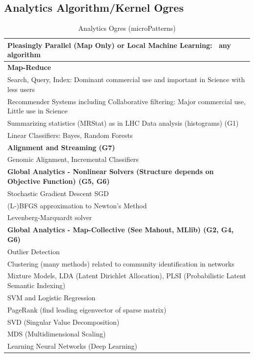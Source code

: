 \documentclass{acm_proc_article-sp}
\begin{document}
\subsection{Analytics Algorithm/Kernel Ogres}
\begin{table}
\centering
\caption{Analytics Ogres (microPatterns)}
\label{Table9}
\begin{tabular}{|p{12cm}|} \hline

\textbf{Pleasingly Parallel (Map Only) or Local Machine Learning: ~any algorithm} \\ \hline
\textbf{Map-Reduce} \\ \hline
Search, Query, Index: Dominant commercial use and important in Science with less users \\ \hline
Recommender Systems including Collaborative filtering: Major commercial use, Little use in Science \\ \hline
Summarizing statistics (MRStat) as in LHC Data analysis (histograms) (G1) \\ \hline
Linear Classifiers: Bayes, Random Forests \\ \hline
\textbf{Alignment and Streaming (G7)} \\ \hline
Genomic Alignment, Incremental Classifiers \\ \hline
\textbf{Global Analytics - Nonlinear Solvers (Structure depends on Objective Function) (G5, G6)} \\ \hline
Stochastic Gradient Descent SGD \\ \hline
(L-)BFGS approximation to Newton's Method \\ \hline
Levenberg-Marquardt solver \\ \hline
\textbf{Global Analytics - Map-Collective (See Mahout, MLlib) (G2, G4, G6)} \\ \hline
Outlier Detection \\ \hline
Clustering (many methods) related to community identification in networks \\ \hline
Mixture Models, LDA (Latent Dirichlet Allocation), PLSI (Probabilistic Latent Semantic Indexing)\\ \hline
SVM and Logistic Regression\\ \hline
PageRank (find leading eigenvector of sparse matrix)\\ \hline
SVD (Singular Value Decomposition)\\ \hline
MDS (Multidimensional Scaling)\\ \hline
Learning Neural Networks (Deep Learning)\\ \hline

\end{tabular}
\end{table}
\end{document}

